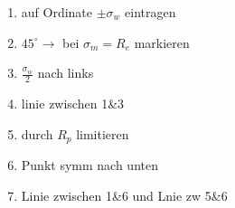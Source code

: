 \begin{enumerate}
            \item auf Ordinate $\pm\sigma_w$ eintragen
            \item $45^{\circ}\rightarrow$ bei $\sigma_m = R_e$ markieren
            \item $\frac{\sigma_w}{2}$ nach links
            \item linie zwischen 1\&3
            \item durch $R_p$ limitieren
            \item Punkt symm nach unten
            \item Linie zwischen 1\&6 und Lnie zw 5\&6
        \end{enumerate}